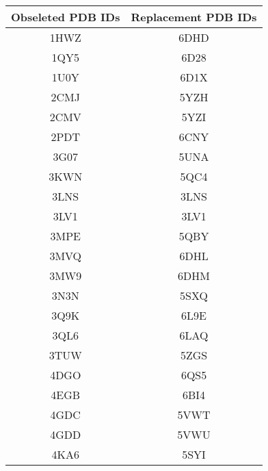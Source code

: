\documentclass[journal=jacsat,manuscript=article]{achemso}
\begin{document}
\begin{center}
  \begin{table}[ht]
    \centering
    \begin{tabular}{|c|c|}
      \hline
      \textbf{Obseleted PDB IDs} & \textbf{Replacement PDB IDs} \\
      \hline
      1HWZ                       & 6DHD                         \\
      1QY5                       & 6D28                         \\
      1U0Y                       & 6D1X                         \\
      2CMJ                       & 5YZH                         \\
      2CMV                       & 5YZI                         \\
      2PDT                       & 6CNY                         \\
      3G07                       & 5UNA                         \\
      3KWN                       & 5QC4                         \\
      3LNS                       & 3LNS                         \\
      3LV1                       & 3LV1                         \\
      3MPE                       & 5QBY                         \\
      3MVQ                       & 6DHL                         \\
      3MW9                       & 6DHM                         \\
      3N3N                       & 5SXQ                         \\
      3Q9K                       & 6L9E                         \\
      3QL6                       & 6LAQ                         \\
      3TUW                       & 5ZGS                         \\
      4DGO                       & 6QS5                         \\
      4EGB                       & 6BI4                         \\
      4GDC                       & 5VWT                         \\
      4GDD                       & 5VWU                         \\
      4KA6                       & 5SYI                         \\

\end{tabular}
\end{table}
\end{center}
\end{document}
